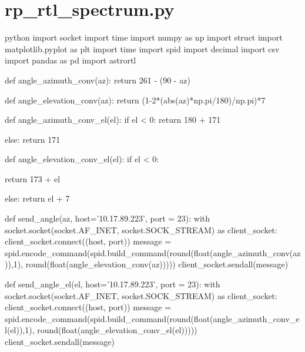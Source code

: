 \section*{rp\_rtl\_spectrum.py}

\begin{sourcecode}[]{python}{}
import socket
import time
import numpy as np
import struct
import matplotlib.pyplot as plt
import time
import spid
import decimal
import csv
import pandas as pd
import astrortl

def angle_azimuth_conv(az):
    return 261 - (90 - az)

def angle_elevation_conv(az):
    return (1-2*(abs(az)*np.pi/180)/np.pi)*7

def angle_azimuth_conv_el(el):
    if el < 0:
        return 180 + 171

    else:
        return 171

def angle_elevation_conv_el(el):
    if el < 0:
        
        return 173 + el

    else:
        return el + 7
        

def send_angle(az, host='10.17.89.223', port = 23):
    with socket.socket(socket.AF_INET, socket.SOCK_STREAM) as client_socket:
        client_socket.connect((host, port))
        message = spid.encode_command(spid.build_command(round(float(angle_azimuth_conv(az)),1), round(float(angle_elevation_conv(az)))))
        client_socket.sendall(message)

def send_angle_el(el, host='10.17.89.223', port = 23):
    with socket.socket(socket.AF_INET, socket.SOCK_STREAM) as client_socket:
        client_socket.connect((host, port))
        message = spid.encode_command(spid.build_command(round(float(angle_azimuth_conv_el(el)),1), round(float(angle_elevation_conv_el(el)))))
        client_socket.sendall(message)

\end{sourcecode}